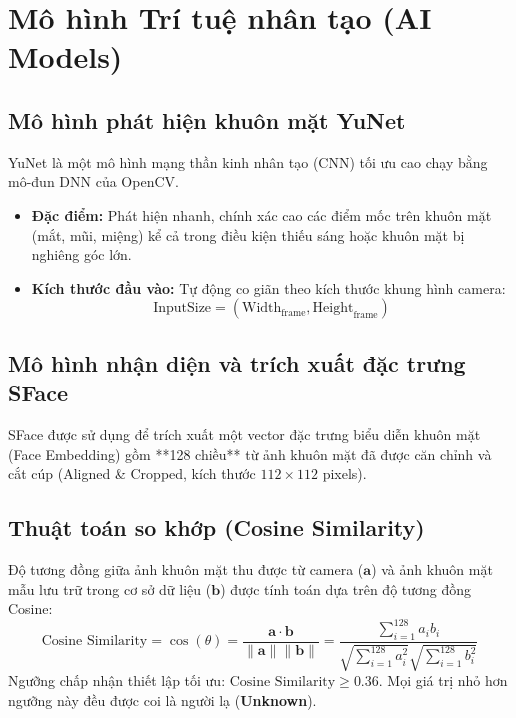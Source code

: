 \documentclass[12pt,a4paper]{article}
\begin{document}
\newpage
\section{Mô hình Trí tuệ nhân tạo (AI Models)}

\subsection{Mô hình phát hiện khuôn mặt YuNet}
YuNet là một mô hình mạng thần kinh nhân tạo (CNN) tối ưu cao chạy bằng mô-đun DNN của OpenCV. 
\begin{itemize}
    \item \textbf{Đặc điểm:} Phát hiện nhanh, chính xác cao các điểm mốc trên khuôn mặt (mắt, mũi, miệng) kể cả trong điều kiện thiếu sáng hoặc khuôn mặt bị nghiêng góc lớn.
    \item \textbf{Kích thước đầu vào:} Tự động co giãn theo kích thước khung hình camera:
    \begin{equation}
    \text{InputSize} = (\text{Width}_{\text{frame}}, \text{Height}_{\text{frame}})
    \end{equation}
\end{itemize}

\subsection{Mô hình nhận diện và trích xuất đặc trưng SFace}
SFace được sử dụng để trích xuất một vector đặc trưng biểu diễn khuôn mặt (Face Embedding) gồm **128 chiều** từ ảnh khuôn mặt đã được căn chỉnh và cắt cúp (Aligned \& Cropped, kích thước $112 \times 112$ pixels).

\subsection{Thuật toán so khớp (Cosine Similarity)}
Độ tương đồng giữa ảnh khuôn mặt thu được từ camera ($\mathbf{a}$) và ảnh khuôn mặt mẫu lưu trữ trong cơ sở dữ liệu ($\mathbf{b}$) được tính toán dựa trên độ tương đồng Cosine:
\begin{equation}
\text{Cosine Similarity} = \cos(\theta) = \frac{\mathbf{a} \cdot \mathbf{b}}{\|\mathbf{a}\| \|\mathbf{b}\|} = \frac{\sum_{i=1}^{128} a_i b_i}{\sqrt{\sum_{i=1}^{128} a_i^2} \sqrt{\sum_{i=1}^{128} b_i^2}}
\end{equation}
Ngưỡng chấp nhận thiết lập tối ưu: $\text{Cosine Similarity} \ge 0.36$. Mọi giá trị nhỏ hơn ngưỡng này đều được coi là người lạ (\textbf{Unknown}).
\end{document}
